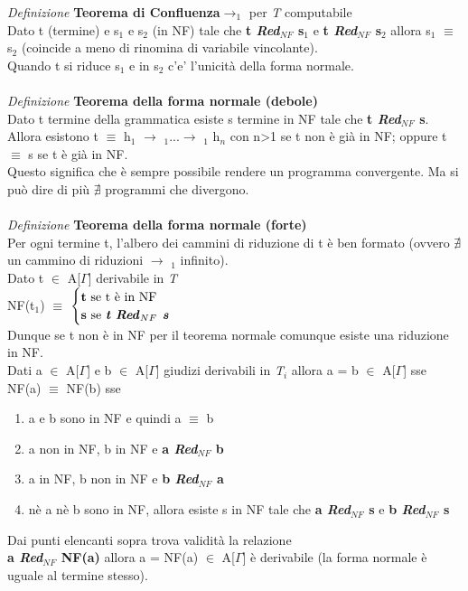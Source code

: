 \documentclass[10pt,a4paper, italian]{book}
\begin{document}
{{{\noindent
\textit{Definizione} \textbf{Teorema di Confluenza}$\rightarrow _1$ per \textit{T} computabile\\
Dato t (termine) e s$_1$ e s$_2$ (in NF) tale che \textbf{t \textit{Red$_{NF}$ }s$_1$} e \textbf{t \textit{Red$_{NF}$} s$_2$} allora s$_1$ $\equiv$ s$_2$ (coincide a meno di rinomina di variabile  vincolante).\\
Quando t si riduce s$_1$ e in s$_2$ c'e' l'unicit\`a della forma normale.
\\\\
\noindent
\textit{Definizione} \textbf{Teorema della forma normale (debole)}\\
Dato t termine della grammatica esiste s termine in NF tale che \textbf{t \textit{Red$_{NF}$ }s}. Allora esistono t $\equiv$ h$_1$ $\rightarrow$ $_1$...$\rightarrow$ $_1$ h$_n$ con n>1 se t non \`e gi\`a in NF; oppure t $\equiv$ s se t \`e gi\`a in NF.\\
Questo significa che \`e sempre possibile rendere un programma convergente. Ma si pu\`o dire di pi\`u $\nexists$ programmi che divergono. 
\\\\
\noindent
\textit{Definizione} \textbf{Teorema della forma normale (forte)}\\
Per ogni termine t, l'albero dei cammini di riduzione di t \`e ben formato (ovvero $\nexists$ un cammino di riduzioni $\rightarrow$ $_1$ infinito).\\
Dato t $\in$ A[$\Gamma$] derivabile in \textit{T}\\
NF(t$_1$) $\equiv$
$
\begin{cases}
\text{\textbf{t} se t è in NF} \\
\text{\textbf{s} se \textit{\textbf{t Red}}}_{NF} \text{\textit{\textbf{ s}}}
\end{cases}
$
\\
Dunque se t non \`e in NF per il teorema normale comunque esiste una riduzione in NF.\\
Dati a $\in$ A[$\Gamma$] e b $\in$ A[$\Gamma$] giudizi derivabili in \textit{T$_i$} allora a = b $\in$ A[$\Gamma$] sse NF(a) $\equiv$ NF(b) sse
\begin{enumerate}
\item a e b sono in NF e quindi a $\equiv$ b
\item a non in NF, b in NF e \textbf{a \textit{Red$_{NF}$ }b}
\item a in NF, b non in NF e \textbf{b \textit{Red$_{NF}$ }a}
\item n\`e a n\`e b sono in NF, allora esiste s in NF tale che \textbf{a \textit{Red$_{NF}$ }s} e \textbf{b \textit{Red$_{NF}$ }s}
\end{enumerate}
Dai punti elencanti sopra trova validit\`a la relazione\\\textbf{a \textit{Red$_{NF}$ }NF(a)} allora a = NF(a) $\in$ A[$\Gamma$] \`e derivabile (la forma normale \`e uguale al termine stesso).

}}}
\end{document}
